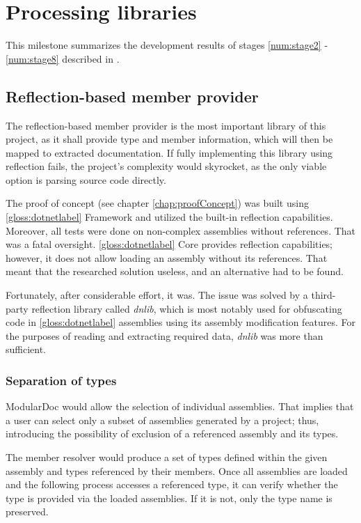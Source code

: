 \chapter{Processing libraries} \label{chap:processingLibraries}

This milestone summarizes the development results of stages \ref{num:stage2} - \ref{num:stage8} described in .

\section{Reflection-based member provider}

The reflection-based member provider is the most important library of this project, as it shall provide type and member information, which will then be mapped to extracted documentation. If fully implementing this library using reflection fails, the project's complexity would skyrocket, as the only viable option is parsing source code directly.

The proof of concept (see chapter \ref{chap:proofConcept}) was built using \ref{gloss:dotnetlabel} Framework and utilized the built-in reflection capabilities. Moreover, all tests were done on non-complex assemblies without references. That was a fatal oversight. \ref{gloss:dotnetlabel} Core provides reflection capabilities; however, it does not allow loading an assembly without its references. That meant that the researched solution useless, and an alternative had to be found.

Fortunately, after considerable effort, it was. The issue was solved by a third-party reflection library called \textit{dnlib}, which is most notably used for obfuscating code in \ref{gloss:dotnetlabel} assemblies using its assembly modification features. For the purposes of reading and extracting required data, \textit{dnlib} was more than sufficient.

\subsection{Separation of types}

ModularDoc would allow the selection of individual assemblies. That implies that a user can select only a subset of assemblies generated by a project; thus, introducing the possibility of exclusion of a referenced assembly and its types.

The member resolver would produce a set of types defined within the given assembly and types referenced by their members. Once all assemblies are loaded and the following process accesses a referenced type, it can verify whether the type is provided via the loaded assemblies. If it is not, only the type name is preserved.

